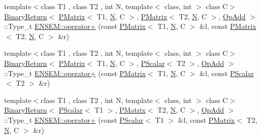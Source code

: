 \begin{DoxyCompactItemize}
{\footnotesize template$<$class T1 , class T2 , int N, template$<$ class, int $>$ class C$>$ }\\\mbox{\hyperlink{structENSEM_1_1BinaryReturn}{Binary\+Return}}$<$ \mbox{\hyperlink{classENSEM_1_1PMatrix}{P\+Matrix}}$<$ T1, \mbox{\hyperlink{operator__name__util_8cc_a7722c8ecbb62d99aee7ce68b1752f337}{N}}, C $>$, \mbox{\hyperlink{classENSEM_1_1PMatrix}{P\+Matrix}}$<$ T2, \mbox{\hyperlink{operator__name__util_8cc_a7722c8ecbb62d99aee7ce68b1752f337}{N}}, C $>$, \mbox{\hyperlink{structENSEM_1_1OpAdd}{Op\+Add}} $>$\+::Type\+\_\+t \mbox{\hyperlink{group__primmatrix_ga14b22344862e687608f50a8386764f6d}{E\+N\+S\+E\+M\+::operator+}} (const \mbox{\hyperlink{classENSEM_1_1PMatrix}{P\+Matrix}}$<$ T1, \mbox{\hyperlink{operator__name__util_8cc_a7722c8ecbb62d99aee7ce68b1752f337}{N}}, C $>$ \&l, const \mbox{\hyperlink{classENSEM_1_1PMatrix}{P\+Matrix}}$<$ T2, \mbox{\hyperlink{operator__name__util_8cc_a7722c8ecbb62d99aee7ce68b1752f337}{N}}, C $>$ \&r)
\item 
{\footnotesize template$<$class T1 , class T2 , int N, template$<$ class, int $>$ class C$>$ }\\\mbox{\hyperlink{structENSEM_1_1BinaryReturn}{Binary\+Return}}$<$ \mbox{\hyperlink{classENSEM_1_1PMatrix}{P\+Matrix}}$<$ T1, \mbox{\hyperlink{operator__name__util_8cc_a7722c8ecbb62d99aee7ce68b1752f337}{N}}, C $>$, \mbox{\hyperlink{classENSEM_1_1PScalar}{P\+Scalar}}$<$ T2 $>$, \mbox{\hyperlink{structENSEM_1_1OpAdd}{Op\+Add}} $>$\+::Type\+\_\+t \mbox{\hyperlink{group__primmatrix_gacd1e2ab4740e640c1aa2862faf4436db}{E\+N\+S\+E\+M\+::operator+}} (const \mbox{\hyperlink{classENSEM_1_1PMatrix}{P\+Matrix}}$<$ T1, \mbox{\hyperlink{operator__name__util_8cc_a7722c8ecbb62d99aee7ce68b1752f337}{N}}, C $>$ \&l, const \mbox{\hyperlink{classENSEM_1_1PScalar}{P\+Scalar}}$<$ T2 $>$ \&r)
\item 
{\footnotesize template$<$class T1 , class T2 , int N, template$<$ class, int $>$ class C$>$ }\\\mbox{\hyperlink{structENSEM_1_1BinaryReturn}{Binary\+Return}}$<$ \mbox{\hyperlink{classENSEM_1_1PScalar}{P\+Scalar}}$<$ T1 $>$, \mbox{\hyperlink{classENSEM_1_1PMatrix}{P\+Matrix}}$<$ T2, \mbox{\hyperlink{operator__name__util_8cc_a7722c8ecbb62d99aee7ce68b1752f337}{N}}, C $>$, \mbox{\hyperlink{structENSEM_1_1OpAdd}{Op\+Add}} $>$\+::Type\+\_\+t \mbox{\hyperlink{group__primmatrix_ga39561cdaedaf3bb4fb108575dae42de6}{E\+N\+S\+E\+M\+::operator+}} (const \mbox{\hyperlink{classENSEM_1_1PScalar}{P\+Scalar}}$<$ T1 $>$ \&l, const \mbox{\hyperlink{classENSEM_1_1PMatrix}{P\+Matrix}}$<$ T2, \mbox{\hyperlink{operator__name__util_8cc_a7722c8ecbb62d99aee7ce68b1752f337}{N}}, C $>$ \&r)

\end{DoxyCompactItemize}
